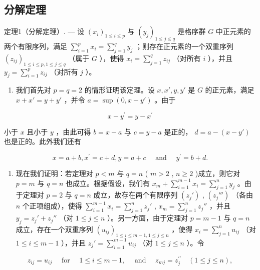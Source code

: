 \subsection{分解定理}

定理1（分解定理）. --- 设 \((x_i)_{1 \leq i \leq p}\) 与 \((y_j)_{1 \leq j \leq q}\) 是格序群 \(G\) 中正元素的两个有限序列，满足 \(\sum_{i=1}^{p} x_i = \sum_{j=1}^{q} y_j\) ；则存在正元素的一个双重序列 \((z_{ij})_{1 \leq i \leq p, 1 \leq j \leq q}\) （属于 \(G\) ），使得 \(x_i = \sum_{j=1}^{q} z_{ij}\) （对所有 \(i\) ），并且 \(y_j = \sum_{i=1}^{p} z_{ij}\) （对所有 \(j\) ）。

\begin{enumerate}
\def\labelenumi{\arabic{enumi})}
\tightlist
\item
  我们首先对 \(p = q = 2\) 的情形证明该定理。设 \(x, x', y, y'\) 是 \(G\) 的正元素，满足 \(x + x' = y + y'\) ，并令 \(a = \sup (0, x - y')\) 。由于
\end{enumerate}

\[
x - y ^ {\prime} = y - x ^ {\prime}
\]

小于 \(x\) 且小于 \(y\) ，由此可得 \(b = x - a\) 与 \(c = y - a\) 是正的， \(d = a - (x - y')\) 也是正的。此外我们还有

\[
x = a + b, x ^ {\prime} = c + d, y = a + c \quad \text { and } \quad y ^ {\prime} = b + d.
\]

\begin{enumerate}
\def\labelenumi{\arabic{enumi})}
\setcounter{enumi}{1}
\tightlist
\item
  现在我们证明：若定理对 \(p < m\) 与 \(q = n\) ( \(m > 2\) , \(n \geqslant 2\) )成立，则它对 \(p = m\) 与 \(q = n\) 也成立。根据假设，我们有 \(x_{m} + \sum_{i=1}^{m-1} x_{i} = \sum_{j=1}^{n} y_{j}\) 。由于定理对 \(p = 2\) 与 \(q = n\) 成立，故存在两个有限序列 \((z_{j}')\) , \((z_{j}''')\) （各由 \(n\) 个正项组成），使得 \(\sum_{i=1}^{m-1} x_{i} = \sum_{j=1}^{n} z_{j}'\) , \(x_{m} = \sum_{j=1}^{n} z_{j}''\) ，并且 \(y_{j} = z_{j}' + z_{j}''\) （对 \(1 \leqslant j \leqslant n\) ）。另一方面，由于定理对 \(p = m-1\) 与 \(q = n\) 成立，存在一个双重序列 \((u_{ij})_{1 \leqslant i \leqslant m-1, 1 \leqslant j \leqslant n}\) ，使得 \(x_{i} = \sum_{j=1}^{n} u_{ij}\) （对 \(1 \leqslant i \leqslant m-1\) ），并且 \(z_{j}' = \sum_{i=1}^{m-1} u_{ij}\) （对 \(1 \leqslant j \leqslant n\) ）。令
\end{enumerate}

\[
z _ {i j} = u _ {i j} \quad \text { for } \quad 1 \leqslant i \leqslant m - 1, \quad \text { and } \quad z _ {m j} = z _ {j} ^ {\prime \prime} \quad (1 \leqslant j \leqslant n),
\]

